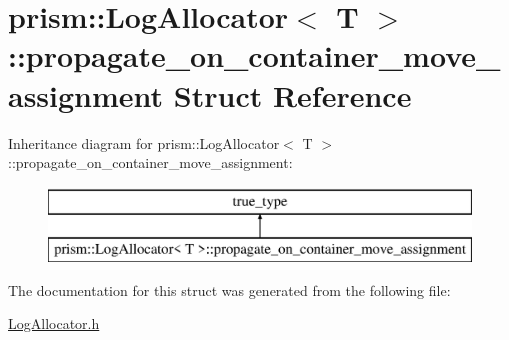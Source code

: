 \hypertarget{structprism_1_1_log_allocator_1_1propagate__on__container__move__assignment}{}\section{prism\+:\+:Log\+Allocator$<$ T $>$\+:\+:propagate\+\_\+on\+\_\+container\+\_\+move\+\_\+assignment Struct Reference}
\label{structprism_1_1_log_allocator_1_1propagate__on__container__move__assignment}
Inheritance diagram for prism\+:\+:Log\+Allocator$<$ T $>$\+:\+:propagate\+\_\+on\+\_\+container\+\_\+move\+\_\+assignment\+:\begin{figure}[H]
\begin{center}
\leavevmode
\includegraphics[height=2.000000cm]{structprism_1_1_log_allocator_1_1propagate__on__container__move__assignment}
\end{center}
\end{figure}


The documentation for this struct was generated from the following file\+:\begin{DoxyCompactItemize}
\item 
\hyperlink{_log_allocator_8h}{Log\+Allocator.\+h}\end{DoxyCompactItemize}
